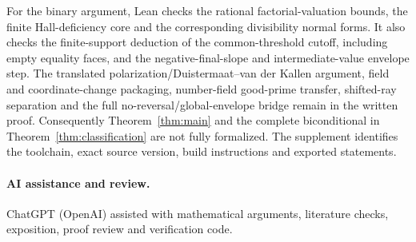 \documentclass[11pt]{article}
\begin{document}
For the binary argument, Lean checks the rational factorial-valuation
bounds, the finite Hall-deficiency core and the corresponding divisibility
normal forms.  It also checks the finite-support deduction of the
common-threshold cutoff, including empty equality faces, and the
negative-final-slope and intermediate-value envelope step.  The
translated polarization/Duistermaat--van der Kallen argument, field and
coordinate-change packaging, number-field good-prime transfer,
shifted-ray separation and the full no-reversal/global-envelope bridge
remain in the written proof.  Consequently Theorem~\ref{thm:main} and
the complete biconditional in Theorem~\ref{thm:classification} are not
fully formalized.  The supplement identifies the toolchain, exact source
version, build instructions and exported statements.

\paragraph{AI assistance and review.}
ChatGPT (OpenAI) assisted with mathematical arguments, literature checks,
exposition, proof review and verification code.



\end{document}
